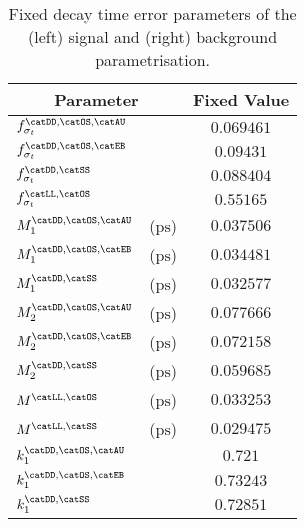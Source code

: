 \begin{table}[h]
\caption{Fixed decay time error parameters of the (left) signal and (right)
background parametrisation.}
\label{tab:app:measurement_of_sin2beta:cpv_measurement:fixed_parameters:decay_time_error}
\centering
\begin{tabular}[t]{llr@{$\,\pm\,$}l}
  \toprule
  \multicolumn{2}{c}{Parameter}              & \multicolumn{2}{c}{Fixed Value} \\
  \midrule
  $f_{\sigma_t}^\text{\catDD,\catOS,\catAU}$ &                       & \multicolumn{2}{c}{$0.069461$}\\
  $f_{\sigma_t}^\text{\catDD,\catOS,\catEB}$ &                       & \multicolumn{2}{c}{$0.09431$}\\
  $f_{\sigma_t}^\text{\catDD,\catSS}$        &                       & \multicolumn{2}{c}{$0.088404$}\\
  $f_{\sigma_t}^\text{\catLL,\catOS}$        &                       & \multicolumn{2}{c}{$0.55165$}\\
  $M_1^\text{\catDD,\catOS,\catAU}$          & ($\si{\pico\second}$) & \multicolumn{2}{c}{$0.037506$}\\
  $M_1^\text{\catDD,\catOS,\catEB}$          & ($\si{\pico\second}$) & \multicolumn{2}{c}{$0.034481$}\\
  $M_1^\text{\catDD,\catSS}$                 & ($\si{\pico\second}$) & \multicolumn{2}{c}{$0.032577$}\\
  $M_2^\text{\catDD,\catOS,\catAU}$          & ($\si{\pico\second}$) & \multicolumn{2}{c}{$0.077666$}\\
  $M_2^\text{\catDD,\catOS,\catEB}$          & ($\si{\pico\second}$) & \multicolumn{2}{c}{$0.072158$}\\
  $M_2^\text{\catDD,\catSS}$                 & ($\si{\pico\second}$) & \multicolumn{2}{c}{$0.059685$}\\
  $M^\text{\catLL,\catOS}$                   & ($\si{\pico\second}$) & \multicolumn{2}{c}{$0.033253$}\\
  $M^\text{\catLL,\catSS}$                   & ($\si{\pico\second}$) & \multicolumn{2}{c}{$0.029475$}\\
  $k_1^\text{\catDD,\catOS,\catAU}$          &                       & \multicolumn{2}{c}{$0.721$}\\
  $k_1^\text{\catDD,\catOS,\catEB}$          &                       & \multicolumn{2}{c}{$0.73243$}\\
  $k_1^\text{\catDD,\catSS}$                 &                       & \multicolumn{2}{c}{$0.72851$}\\

\end{tabular}
\end{table}
